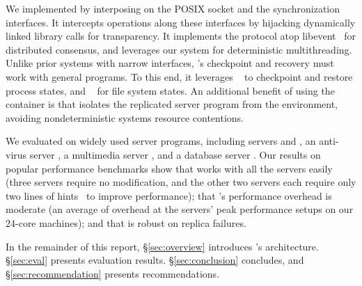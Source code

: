 

We implemented \xxx by interposing on the POSIX socket and the \pthread
synchronization interfaces.  It intercepts operations along these
interfaces by hijacking dynamically linked library calls for transparency.
It implements the \paxos protocol atop libevent~\cite{libevent} for
distributed consensus, and leverages our \parrot system for deterministic
multithreading.  Unlike prior \smr systems with narrow interfaces, \xxx's
checkpoint and recovery must work with general programs. To this end, it
leverages \criu~\cite{criu} to checkpoint and restore process states, and
\lxc~\cite{lxc} for file system states.  An additional benefit of using
the \lxc container is that \xxx isolates the replicated server program
from the environment, avoiding nondeterministic systems resource contentions.


We evaluated \xxx on \nprog widely used server programs,
including \http servers \apache and \mongoose, an anti-virus server
\clamav, a \upnp multimedia server \mediatomb, and a database server \mysql. 
Our results on popular performance benchmarks show that \xxx works with
all the servers easily (three servers require no modification, and the
other two servers each require only two lines of \parrot hints~\cite{parrot:sosp13}
to improve performance); that \xxx's performance overhead is
moderate (an average of \overhead overhead at the servers' peak 
performance setups on our 24-core machines); and that \xxx is robust on replica 
failures.

In the remainder of this report, \S\ref{sec:overview} introduces \xxx's 
architecture. \S\ref{sec:eval} presents evaluation results. 
\S\ref{sec:conclusion} concludes, and \S\ref{sec:recommendation} presents 
recommendations.



























